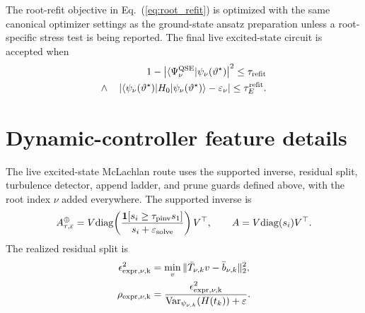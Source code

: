 \documentclass[
  reprint,
  amsmath,
  amssymb,
  aps,
  pra,
  nofootinbib,
  superscriptaddress,
  floatfix
]{revtex4-2}
\newcommand{\qse}{\mathrm{QSE}}
\newcommand{\Var}{\operatorname{Var}}
\newcommand{\diag}{\mathrm{diag}}
\newcommand{\eps}{\varepsilon}
\newcommand{\ket}[1]{|#1\rangle}
\newcommand{\bra}[1]{\langle #1|}
\begin{document}
The root-refit objective in Eq.~(\ref{eq:root_refit}) is optimized with the same canonical optimizer settings as the ground-state ansatz preparation unless a root-specific stress test is being reported.  The final live excited-state circuit is accepted when
\begin{equation}
\begin{aligned}
1-
\left|
\bra{\Psi_\nu^{\qse}}\psi_\nu(\vartheta^\star)
\right|^2
\le\tau_{\rm refit}
\\
\wedge\quad
\left|
\bra{\psi_\nu(\vartheta^\star)}
H_0
\ket{\psi_\nu(\vartheta^\star)}
-\varepsilon_\nu
\right|
\le\tau_E^{\rm refit}.
\end{aligned}
\label{eq:app_refit_accept}
\end{equation}

\section{Dynamic-controller feature details}
\label{app:excited_dynamic_controller_details}

The live excited-state McLachlan route uses the supported inverse, residual split, turbulence detector, append ladder, and prune guards defined above, with the root index $\nu$ added everywhere.  The supported inverse is
\begin{equation}
A_{\tau,\eps}^{\oplus}
=
V\diag\!\left(
\frac{\mathbf 1[s_i\ge\tau_{\rm pinv}s_1]}{s_i+\eps_{\rm solve}}
\right)V^\top,
\qquad
A=V\diag(s_i)V^\top.
\label{eq:app_excited_supported_inverse}
\end{equation}
The realized residual split is
\begin{equation}
\begin{aligned}
\epsilon_{\rm expr,\nu,k}^2
&=\min_v\|\bar T_{\nu,k}v-\bar b_{\nu,k}\|_2^2,\\
\rho_{\rm expr,\nu,k}
&=
\frac{\epsilon_{\rm expr,\nu,k}^2}
{\Var_{\psi_{\nu,k}}(H(t_k))+\eps}.
\end{aligned}
\label{eq:app_excited_expr_split}
\end{equation}
\end{document}

